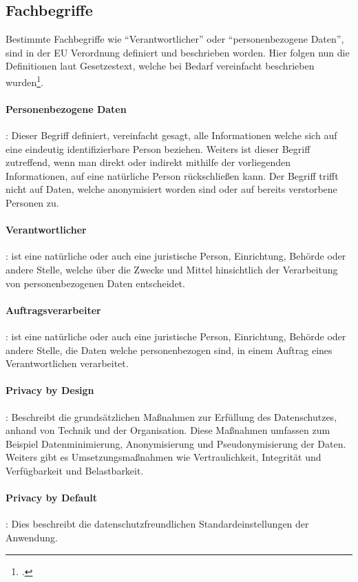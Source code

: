 \subsection{Fachbegriffe}
Bestimmte Fachbegriffe wie "`Verantwortlicher"' oder "`personenbezogene Daten"', sind in der EU Verordnung definiert und beschrieben worden. Hier folgen nun die Definitionen laut Gesetzestext, welche bei Bedarf vereinfacht beschrieben wurden\footcite{mehr-dsgvo}. 

\paragraph{Personenbezogene Daten}: Dieser Begriff definiert, vereinfacht gesagt, alle Informationen welche sich auf eine eindeutig identifizierbare Person beziehen. Weiters ist dieser Begriff zutreffend, wenn man direkt oder indirekt mithilfe der vorliegenden Informationen, auf eine natürliche Person rückschließen kann.
Der Begriff trifft nicht auf Daten, welche anonymisiert worden sind oder auf bereits verstorbene Personen zu.

\paragraph{Verantwortlicher}: ist eine natürliche oder auch eine juristische Person, Einrichtung, Behörde oder andere Stelle, welche über die Zwecke und Mittel hinsichtlich der Verarbeitung von personenbezogenen Daten entscheidet.

\paragraph{Auftragsverarbeiter}: ist eine natürliche oder auch eine juristische Person, Einrichtung, Behörde oder andere Stelle, die Daten welche personenbezogen sind, in einem Auftrag eines Verantwortlichen verarbeitet.

\paragraph{Privacy by Design}: Beschreibt die grundsätzlichen Maßnahmen zur Erfüllung des Datenschutzes, anhand von Technik und der Organisation. Diese Maßnahmen umfassen zum Beispiel Datenminimierung, Anonymisierung und Pseudonymisierung der Daten. Weiters gibt es Umsetzungsmaßnahmen wie Vertraulichkeit, Integrität und Verfügbarkeit und Belastbarkeit.

\paragraph{Privacy by Default}: Dies beschreibt die datenschutzfreundlichen Standardeinstellungen der Anwendung.

